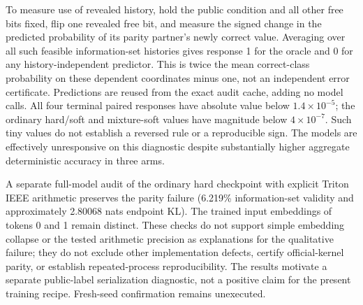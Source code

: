 To measure use of revealed history, hold the public condition and all other free bits fixed, flip one revealed free bit, and measure the signed change in the predicted probability of its parity partner's newly correct value. Averaging over all such feasible information-set histories gives response 1 for the oracle and 0 for any history-independent predictor. This is twice the mean correct-class probability on these dependent coordinates minus one, not an independent error certificate. Predictions are reused from the exact audit cache, adding no model calls. All four terminal paired responses have absolute value below $1.4\times10^{-5}$; the ordinary hard/soft and mixture-soft values have magnitude below $4\times10^{-7}$. Such tiny values do not establish a reversed rule or a reproducible sign. The models are effectively unresponsive on this diagnostic despite substantially higher aggregate deterministic accuracy in three arms.

A separate full-model audit of the ordinary hard checkpoint with explicit Triton IEEE arithmetic preserves the parity failure (6.219\% information-set validity and approximately 2.80068 nats endpoint KL). The trained input embeddings of tokens 0 and 1 remain distinct. These checks do not support simple embedding collapse or the tested arithmetic precision as explanations for the qualitative failure; they do not exclude other implementation defects, certify official-kernel parity, or establish repeated-process reproducibility. The results motivate a separate public-label serialization diagnostic, not a positive claim for the present training recipe. Fresh-seed confirmation remains unexecuted.
